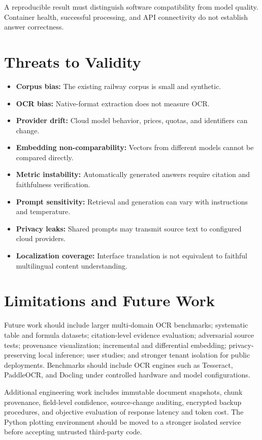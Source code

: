 \documentclass[conference]{IEEEtran}
\begin{document}
A reproducible result must distinguish software compatibility from model quality. Container health, successful processing, and API connectivity do not establish answer correctness.

\section{Threats to Validity}
\begin{itemize}
 \item \textbf{Corpus bias:} The existing railway corpus is small and synthetic.
 \item \textbf{OCR bias:} Native-format extraction does not measure OCR.
 \item \textbf{Provider drift:} Cloud model behavior, prices, quotas, and identifiers can change.
 \item \textbf{Embedding non-comparability:} Vectors from different models cannot be compared directly.
 \item \textbf{Metric instability:} Automatically generated answers require citation and faithfulness verification.
 \item \textbf{Prompt sensitivity:} Retrieval and generation can vary with instructions and temperature.
 \item \textbf{Privacy leaks:} Shared prompts may transmit source text to configured cloud providers.
 \item \textbf{Localization coverage:} Interface translation is not equivalent to faithful multilingual content understanding.
\end{itemize}

\section{Limitations and Future Work}
Future work should include larger multi-domain OCR benchmarks; systematic table and formula datasets; citation-level evidence evaluation; adversarial source tests; provenance visualization; incremental and differential embedding; privacy-preserving local inference; user studies; and stronger tenant isolation for public deployments. Benchmarks should include OCR engines such as Tesseract, PaddleOCR, and Docling under controlled hardware and model configurations.

Additional engineering work includes immutable document snapshots, chunk provenance, field-level confidence, source-change auditing, encrypted backup procedures, and objective evaluation of response latency and token cost. The Python plotting environment should be moved to a stronger isolated service before accepting untrusted third-party code.
\end{document}
